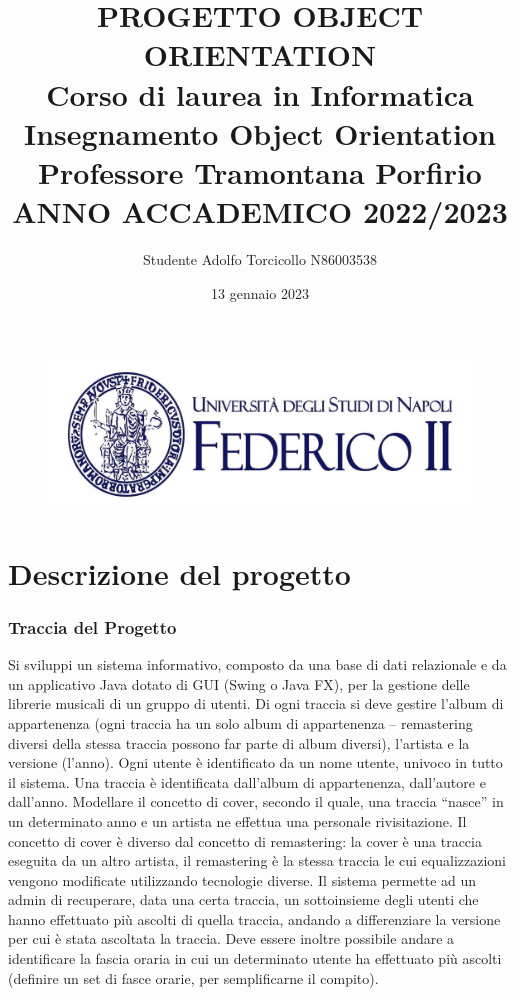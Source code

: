 \documentclass[11pt]{article}
\title{PROGETTO OBJECT ORIENTATION\\Corso di laurea in Informatica\\Insegnamento Object Orientation
\\ Professore Tramontana Porfirio \\ANNO ACCADEMICO 2022/2023  }
\author{Studente Adolfo Torcicollo N86003538}
\date{13 gennaio 2023}
\begin{document}
	\begin{figure}
		\centering
		\includegraphics[width=0.8\linewidth]{UNINA-2.jpg}
		\maketitle
	\end{figure}


	\clearpage

	\part{Descrizione del progetto}
	\section{Traccia del Progetto}

	Si sviluppi un sistema informativo, composto da una base di dati relazionale e da un applicativo Java dotato di GUI (Swing o 
	Java FX), per la gestione delle librerie musicali di un gruppo di utenti. Di ogni traccia si deve gestire l’album di appartenenza 
	(ogni traccia ha un solo album di appartenenza – remastering diversi della stessa traccia possono far parte di album diversi), 
	l’artista e la versione (l’anno). Ogni utente è identificato da un nome utente, univoco in tutto il sistema. Una traccia è 
	identificata dall’album di appartenenza, dall’autore e dall’anno. Modellare il concetto di cover, secondo il quale, una traccia 
	“nasce” in un determinato anno e un artista ne effettua una personale rivisitazione. Il concetto di cover è diverso dal concetto
	di remastering: la cover è una traccia eseguita da un altro artista, il remastering è la stessa traccia le cui equalizzazioni vengono 
	modificate utilizzando tecnologie diverse. Il sistema permette ad un admin di recuperare, data una certa traccia, un 
	sottoinsieme degli utenti che hanno effettuato più ascolti di quella traccia, andando a differenziare la versione per cui è stata 
	ascoltata la traccia. Deve essere inoltre possibile andare a identificare la fascia oraria in cui un determinato utente ha 
	effettuato più ascolti (definire un set di fasce orarie, per semplificarne il compito).
\end{document}
